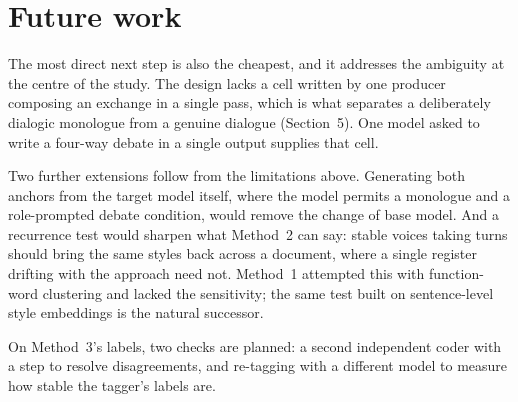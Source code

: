 \documentclass[10pt,twocolumn]{article}
\begin{document}
\section{Future work}
The most direct next step is also the cheapest, and it addresses the ambiguity at the centre of the
study. The design lacks a cell written by one producer composing an exchange in a single pass, which
is what separates a deliberately dialogic monologue from a genuine dialogue (Section~5). One model
asked to write a four-way debate in a single output supplies that cell.

Two further extensions follow from the limitations above. Generating both anchors from the target
model itself, where the model permits a monologue and a role-prompted debate condition, would remove
the change of base model. And a recurrence test would sharpen what Method~2 can say: stable voices
taking turns should bring the same styles back across a document, where a single register drifting
with the approach need not. Method~1 attempted this with function-word clustering and lacked the
sensitivity; the same test built on sentence-level style embeddings is the natural successor.

On Method~3's labels, two checks are planned: a second independent coder with a step to resolve
disagreements, and re-tagging with a different model to measure how stable the tagger's labels are.
\end{document}
